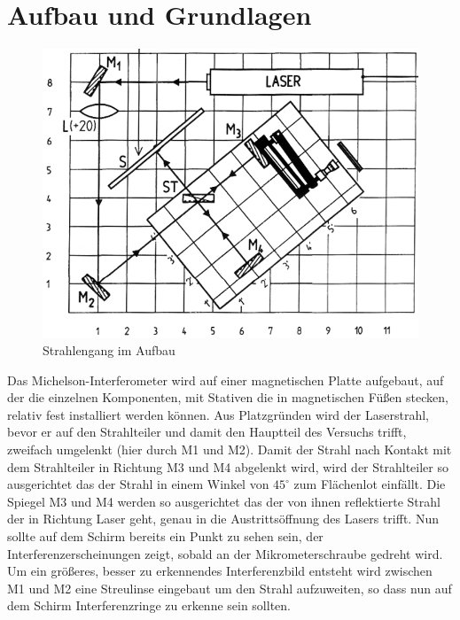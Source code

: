 \documentclass[a4paper, 11pt]{article}
\begin{document}
\section{Aufbau und Grundlagen} 
\begin{figure}[H]
	\centering
	\includegraphics[trim = 0mm 0mm 0mm 0mm,clip, width=12cm]{Bilder/aufbau_optik2.png}%
	\caption[Strahlengang im Aufbau]{Strahlengang im Aufbau}%
	\label{pic:Abbildung 1}%
\end{figure}
Das Michelson-Interferometer wird auf einer magnetischen Platte aufgebaut, auf der die einzelnen Komponenten, mit Stativen die in magnetischen Füßen stecken, relativ fest installiert werden können.
Aus Platzgründen wird der Laserstrahl, bevor er auf den Strahlteiler und damit den Hauptteil des Versuchs trifft, zweifach umgelenkt (hier durch M1 und M2). Damit der Strahl nach Kontakt mit dem Strahlteiler in Richtung M3 und M4 abgelenkt wird, wird der Strahlteiler so ausgerichtet das der Strahl in einem Winkel von $45^\circ$ zum Flächenlot einfällt. Die Spiegel M3 und M4 werden so ausgerichtet das der von ihnen reflektierte Strahl der in Richtung Laser geht, genau in die Austrittsöffnung des Lasers trifft. Nun sollte auf dem Schirm bereits ein Punkt zu sehen sein, der Interferenzerscheinungen zeigt, sobald an der Mikrometerschraube gedreht wird. Um ein größeres, besser zu erkennendes Interferenzbild entsteht wird zwischen M1 und M2 eine Streulinse eingebaut um den Strahl aufzuweiten, so dass nun auf dem Schirm Interferenzringe zu erkenne sein sollten.
\end{document}
